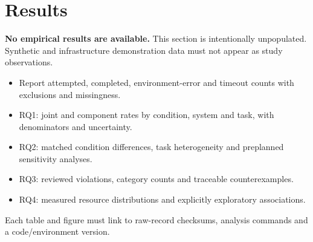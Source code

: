 \section{Results}
\textbf{No empirical results are available.} This section is intentionally unpopulated. Synthetic and
infrastructure demonstration data must not appear as study observations.
\begin{itemize}
\item Report attempted, completed, environment-error and timeout counts with exclusions and missingness.
\item RQ1: joint and component rates by condition, system and task, with denominators and uncertainty.
\item RQ2: matched condition differences, task heterogeneity and preplanned sensitivity analyses.
\item RQ3: reviewed violations, category counts and traceable counterexamples.
\item RQ4: measured resource distributions and explicitly exploratory associations.
\end{itemize}
Each table and figure must link to raw-record checksums, analysis commands and a code/environment version.
